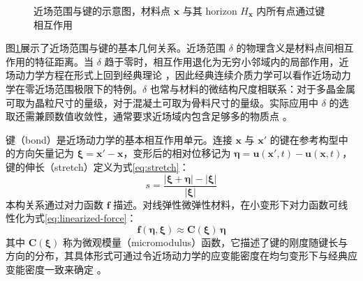 \begin{figure}[htbp]
  \centering
  \caption{近场范围与键的示意图，材料点 $\mathbf{x}$ 与其 horizon $H_{\mathbf{x}}$ 内所有点通过键相互作用}
  \label{fig:horizon-bond}
\end{figure}

图\ref{fig:horizon-bond}展示了近场范围与键的基本几何关系。近场范围 $\delta$ 的物理含义是材料点间相互作用的特征距离。当 $\delta$ 趋于零时，相互作用退化为无穷小邻域内的局部作用，近场动力学方程在形式上回到经典理论 \cite{SillingLehoucq2008}，因此经典连续介质力学可以看作近场动力学在零近场范围极限下的特例。$\delta$ 也常与材料的微结构尺度相联系：对于多晶金属可取为晶粒尺寸的量级，对于混凝土可取为骨料尺寸的量级。实际应用中 $\delta$ 的选取还需兼顾数值收敛性，通常要求近场域内包含足够多的物质点 \cite{Bobaru2009,BobaruHu2012}。

键（bond）是近场动力学的基本相互作用单元。连接 $\mathbf{x}$ 与 $\mathbf{x}'$ 的键在参考构型中的方向矢量记为 $\boldsymbol{\xi}=\mathbf{x}'-\mathbf{x}$，变形后的相对位移记为 $\boldsymbol{\eta}=\mathbf{u}(\mathbf{x}',t)-\mathbf{u}(\mathbf{x},t)$，键的伸长（stretch）定义为式\eqref{eq:stretch}：
\begin{equation}
  s=\frac{|\boldsymbol{\xi}+\boldsymbol{\eta}|-|\boldsymbol{\xi}|}{|\boldsymbol{\xi}|}
  \label{eq:stretch}
\end{equation}
本构关系通过对力函数 $\mathbf{f}$ 描述。对线弹性微弹性材料，在小变形下对力函数可线性化为式\eqref{eq:linearized-force}：
\begin{equation}
  \mathbf{f}(\boldsymbol{\eta},\boldsymbol{\xi})\approx \mathbf{C}(\boldsymbol{\xi})\,\boldsymbol{\eta}
  \label{eq:linearized-force}
\end{equation}
其中 $\mathbf{C}(\boldsymbol{\xi})$ 称为微观模量（micromodulus）函数，它描述了键的刚度随键长与方向的分布，其具体形式可通过令近场动力学的应变能密度在均匀变形下与经典应变能密度一致来确定 \cite{Silling2000,Silling2010}。

